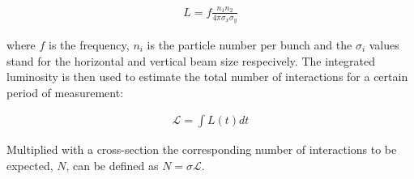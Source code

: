 \begin{align}
L =f \frac{n_1 n_2}{4 \pi \sigma_x \sigma_y}
\end{align}

where $f$ is the frequency, $n_i$ is the particle number per bunch and the $\sigma_i$ values stand for the horizontal and vertical beam size respecively.
The integrated luminosity is then used to estimate the total number of interactions for a certain period of measurement:

\begin{align}
\mathcal{L} = \int L(t) dt
\end{align}

Multiplied with a cross-section the corresponding number of interactions to be expected, $N$, can be defined as $N = \sigma \mathcal{L}$.


